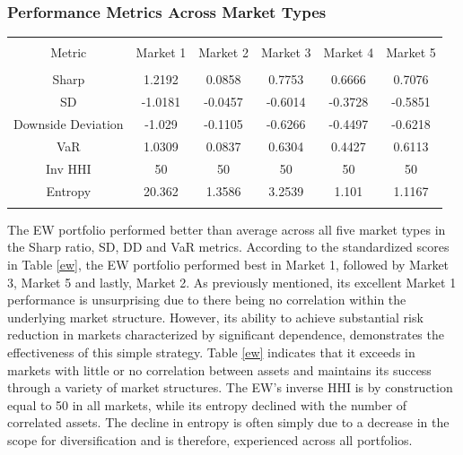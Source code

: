 \documentclass[11pt,preprint, authoryear]{elsarticle}
\let\origtable\table
\let\endorigtable\endtable
\renewenvironment{table}[1][2] {
    \expandafter\origtable\expandafter[H]
} {
    \endorigtable
}
\numberwithin{equation}{section}
\numberwithin{figure}{section}
\numberwithin{table}{section}
\begin{document}
\hypertarget{performance-metrics-across-market-types}{%
\subsubsection{\texorpdfstring{Performance Metrics Across Market Types
\label{perf}}{Performance Metrics Across Market Types }}\label{performance-metrics-across-market-types}}

\begin{table}[!htbp] \centering 
  \caption{Equal Weight} 
  \label{ew} 
\begin{tabular}{@{\extracolsep{5pt}} cccccc} 
\\[-1.8ex]\hline 
\hline \\[-1.8ex] 
Metric & Market 1 & Market 2 & Market 3 & Market 4 & Market 5 \\ 
\hline \\[-1.8ex] 
Sharp & 1.2192 & 0.0858 & 0.7753 & 0.6666 & 0.7076 \\ 
SD & -1.0181 & -0.0457 & -0.6014 & -0.3728 & -0.5851 \\ 
Downside Deviation & -1.029 & -0.1105 & -0.6266 & -0.4497 & -0.6218 \\ 
VaR & 1.0309 & 0.0837 & 0.6304 & 0.4427 & 0.6113 \\ 
Inv HHI & 50 & 50 & 50 & 50 & 50 \\ 
Entropy & 20.362 & 1.3586 & 3.2539 & 1.101 & 1.1167 \\ 
\hline \\[-1.8ex] 
\end{tabular} 
\end{table}

The EW portfolio performed better than average across all five market
types in the Sharp ratio, SD, DD and VaR metrics. According to the
standardized scores in Table \ref{ew}, the EW portfolio performed best
in Market 1, followed by Market 3, Market 5 and lastly, Market 2. As
previously mentioned, its excellent Market 1 performance is unsurprising
due to there being no correlation within the underlying market
structure. However, its ability to achieve substantial risk reduction in
markets characterized by significant dependence, demonstrates the
effectiveness of this simple strategy. Table \ref{ew} indicates that it
exceeds in markets with little or no correlation between assets and
maintains its success through a variety of market structures. The EW's
inverse HHI is by construction equal to 50 in all markets, while its
entropy declined with the number of correlated assets. The decline in
entropy is often simply due to a decrease in the scope for
diversification and is therefore, experienced across all portfolios.
\end{document}
